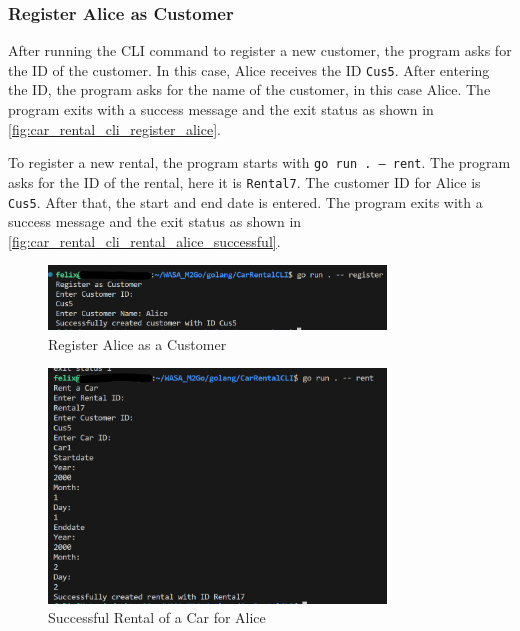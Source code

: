 \subsubsection*{Register Alice as Customer}
After running the CLI command to register a new customer, the program asks for the ID of the customer.
In this case, Alice receives the ID \texttt{Cus5}.
After entering the ID, the program asks for the name of the customer, in this case Alice.
The program exits with a success message and the exit status as shown in \autoref{fig:car_rental_cli_register_alice}.

To register a new rental, the program starts with \texttt{go run . --- rent}.
The program asks for the ID of the rental, here it is \texttt{Rental7}.
The customer ID for Alice is \texttt{Cus5}.
After that, the start and end date is entered.
The program exits with a success message and the exit status as shown in \autoref{fig:car_rental_cli_rental_alice_successful}.

\begin{figure}
      \centering
      \includegraphics[width=0.8\textwidth]{figures/goLang/carRental/carRentalCLI/carRentalCLI_RegisterAlice.png}
      \caption{Register Alice as a Customer}
      \label{fig:car_rental_cli_register_alice}
\end{figure}
\begin{figure}
      \centering
      \includegraphics[width=0.8\textwidth]{figures/goLang/carRental/carRentalCLI/carRentalCLI_SuccessfulRentalAlice.png}
      \caption{Successful Rental of a Car for Alice}
      \label{fig:car_rental_cli_rental_alice_successful}
\end{figure}
